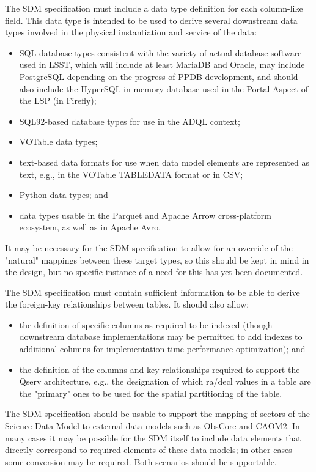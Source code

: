 The SDM specification must include a data type definition for each column-like field.  This data type is intended to be used to derive several downstream data types involved in the physical instantiation and service of the data:

\begin{itemize}
\item     SQL database types consistent with the variety of actual database software used in LSST, which will include at least MariaDB and Oracle, may include PostgreSQL depending on the progress of PPDB development, and should also include the HyperSQL in-memory database used in the Portal Aspect of the LSP (in Firefly);
    \item SQL92-based database types for use in the ADQL context;
    \item VOTable data types;
    \item text-based data formats for use when data model elements are represented as text, e.g., in the VOTable TABLEDATA format or in CSV;
    \item Python data types; and
    \item data types usable in the Parquet and Apache Arrow cross-platform ecosystem, as well as in Apache Avro.
\end{itemize}

It may be necessary for the SDM specification to allow for an override of the "natural" mappings between these target types, so this should be kept in mind in the design, but no specific instance of a need for this has yet been documented.


The SDM specification must contain sufficient information to be able to derive the foreign-key relationships between tables.  It should also allow:
\begin{itemize}
\item the definition of specific columns as required to be indexed (though downstream database implementations may be permitted to add indexes to additional columns for implementation-time performance optimization); and
    \item the definition of the columns and key relationships required to support the Qserv architecture, e.g., the designation of which ra/decl values in a table are the "primary" ones to be used for the spatial partitioning of the table.
\end{itemize}

The SDM specification should be usable to support the mapping of sectors of the Science Data Model to external data models such as ObsCore and CAOM2.  In many cases it may be possible for the SDM itself to include data elements that directly correspond to required elements of these data models; in other cases some conversion may be required.  Both scenarios should be supportable.

